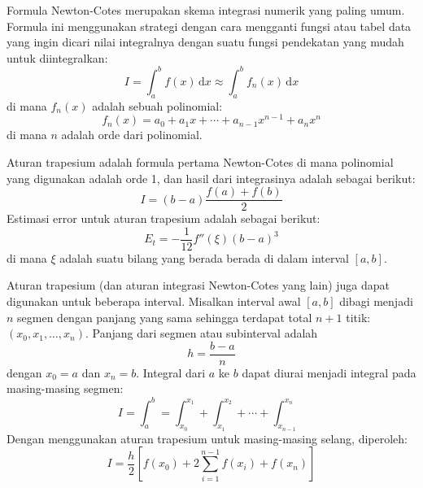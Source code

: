 
Formula Newton-Cotes merupakan skema integrasi numerik yang paling umum.
Formula ini menggunakan strategi dengan cara mengganti fungsi atau tabel data
yang ingin dicari nilai integralnya dengan suatu fungsi pendekatan yang
mudah untuk diintegralkan:
\begin{equation}
I = \int_{a}^{b} f(x) \, \mathrm{d}x \approx \int_{a}^{b} f_{n}(x) \, \mathrm{d}x
\end{equation}
di mana $f_{n}(x)$ adalah sebuah polinomial:
\begin{equation}
f_{n}(x) = a_{0} + a_{1}x + \cdots + a_{n-1} x^{n-1} + a_{n} x^{n}
\end{equation}
di mana $n$ adalah orde dari polinomial.

Aturan trapesium adalah formula pertama Newton-Cotes di mana polinomial yang digunakan
adalah orde 1, dan hasil dari integrasinya adalah sebagai berikut:
\begin{equation}
I = (b - a) \frac{f(a) + f(b)}{2}
\end{equation}
Estimasi error untuk aturan trapesium adalah sebagai berikut:
\begin{equation}
E_{t} = -\frac{1}{12} f''(\xi) (b - a)^3
\end{equation}
di mana $\xi$ adalah suatu bilang yang berada berada di dalam interval $[a,b]$.

Aturan trapesium (dan aturan integrasi Newton-Cotes yang lain)
juga dapat digunakan untuk beberapa interval. Misalkan interval
awal $[a,b]$ dibagi menjadi $n$ segmen dengan panjang yang sama sehingga terdapat
total $n+1$ titik: $(x_0, x_1, \ldots, x_n)$. Panjang dari segmen atau subinterval
adalah
\begin{equation*}
h = \frac{b - a}{n}
\end{equation*}
dengan $x_0 = a$ dan $x_n = b$. Integral dari $a$ ke $b$ dapat diurai menjadi
integral pada masing-masing segmen:
\begin{equation*}
I = \int_{a}^{b} = \int_{x_0}^{x_1} + \int_{x_1}^{x_2} + \cdots + \int_{x_{n-1}}^{x_n}
\end{equation*}
Dengan menggunakan aturan trapesium untuk masing-masing selang, diperoleh:
\begin{equation}
I = \frac{h}{2}\left[
    f(x_{0}) + 2\sum_{i=1}^{n-1} f(x_{i}) + f(x_{n})
\right]
\end{equation}
